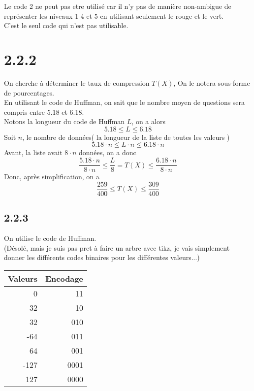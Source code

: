\documentclass[11pt, a4paper, twoside]{article}
\begin{document}
Le code 2 ne peut pas etre utilisé car il n'y pas de manière non-ambigue de représenter les niveaux 1 4 et 5 en utilisant seulement le rouge et le vert.\\
C'est le seul code qui n'est pas utilisable.
















\section*{2.2.2}
On cherche à déterminer le taux de compression $T( X) $, On le notera sous-forme de pourcentages.\\
En utilisant le code de Huffman, on sait que le nombre moyen de questions sera compris entre 5.18 et 6.18.\\
Notons la longueur du code de Huffman $L$, on a alors
\[ 
5.18 \leq L \leq 6.18
\]
Soit $n$, le nombre de données( la longueur de la liste de toutes les valeurs ) 
\[ 
5.18 \cdot n \leq L \cdot n \leq 6.18 \cdot n
\]
Avant, la liste avait $8\cdot n$ données, on a donc
\[ 
	\frac{5.18 \cdot n}{8 \cdot n} \leq \frac{L}{8} = T( X) \leq \frac{6.18 \cdot n}{8 \cdot n}
\]
Donc, après simplification, on a 
\[ 
	 \frac{259}{400} \leq T( X) \leq \frac{309}{400}	
\]


\subsection*{2.2.3}
On utilise le code de Huffman.\\
(Désolé, mais je suis pas pret à faire un arbre avec tikz, je vais simplement donner les différents codes binaires pour les différentes valeurs...) 
\begin{center}
\begin{tabular}{r|r}
Valeurs & Encodage\\
\hline
0 & 11\\
-32 & 10\\
32 & 010\\
-64 & 011\\
64 & 001\\
-127 & 0001\\
127 & 0000\\
\end{tabular}
\end{center}
\end{document}
